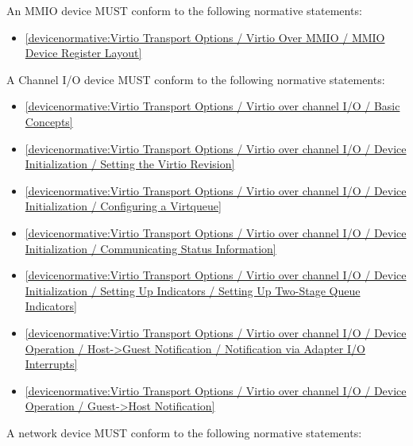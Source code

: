An MMIO device MUST conform to the following normative statements:

\begin{itemize}
\item \ref{devicenormative:Virtio Transport Options / Virtio Over MMIO / MMIO Device Register Layout}
\end{itemize}

\label{sec:Conformance / Device Conformance / Channel I/O Device Conformance}

A Channel I/O device MUST conform to the following normative statements:

\begin{itemize}
\item \ref{devicenormative:Virtio Transport Options / Virtio over channel I/O / Basic Concepts}
\item \ref{devicenormative:Virtio Transport Options / Virtio over channel I/O / Device Initialization / Setting the Virtio Revision}
\item \ref{devicenormative:Virtio Transport Options / Virtio over channel I/O / Device Initialization / Configuring a Virtqueue}
\item \ref{devicenormative:Virtio Transport Options / Virtio over channel I/O / Device Initialization / Communicating Status Information}
\item \ref{devicenormative:Virtio Transport Options / Virtio over channel I/O / Device Initialization / Setting Up Indicators / Setting Up Two-Stage Queue Indicators}
\item \ref{devicenormative:Virtio Transport Options / Virtio over channel I/O / Device Operation / Host->Guest Notification / Notification via Adapter I/O Interrupts}
\item \ref{devicenormative:Virtio Transport Options / Virtio over channel I/O / Device Operation / Guest->Host Notification}
\end{itemize}

\label{sec:Conformance / Device Conformance / Network Device Conformance}

A network device MUST conform to the following normative statements:

